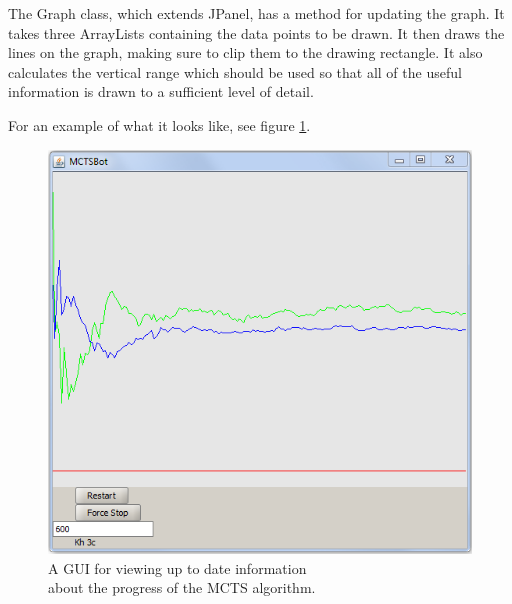 The Graph class, which extends JPanel, has a method for updating the graph. It takes three ArrayLists containing the data points to be drawn. It then draws the lines on the graph, making sure to clip them to the drawing rectangle. It also calculates the vertical range which should be used so that all of the useful information is drawn to a sufficient level of detail. 



For an example of what it looks like, see figure \ref{screenshot:gui}.

\begin{figure}[h!]
\centering
\includegraphics[width=144mm]{Screenshots/GUI.png}
\caption{A GUI for viewing up to date information \\
about the progress of the MCTS algorithm.}
\label{screenshot:gui}
\end{figure}

